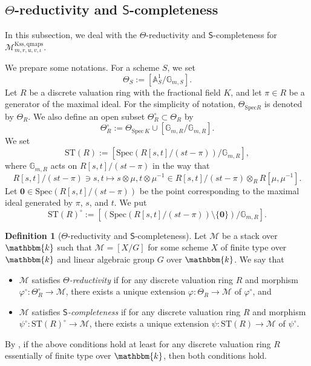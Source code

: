 \documentclass[12pt,twoside]{amsart}
\theoremstyle{definition}
\newtheorem{defn}[thm]{Definition}
\begin{document}
\subsection{$\Theta$-reductivity and $\mathsf{S}$-completeness}

In this subsection, we deal with the $\Theta$-reductivity and $\mathsf{S}$-completeness for $\mathcal{M}^{\mathrm{Kss,qmaps}}_{m,r,u,v,\iota}$. 

We prepare some notations. 
For a scheme $S$, we set 
$$\Theta_S:=[\mathbb{A}^1_{S}/\mathbb{G}_{m,S}].$$
    Let $R$ be a discrete valuation ring with the fractional field $K$, and let $\pi\in R$ be a generator of the maximal ideal.
    For the simplicity of notation, $\Theta_{\mathrm{Spec}R}$ is denoted by $\Theta_R$.
 We also define an open subset $\Theta_R^\circ \subset \Theta_R$ by
$$\Theta_R^\circ:=\Theta_{\mathrm{Spec}\,K}\cup [\mathbb{G}_{m,R}/\mathbb{G}_{m,R}].$$
    We set 
    $$\mathrm{ST}(R):=[\mathrm{Spec}(R[s,t]/(st-\pi))/\mathbb{G}_{m,R}],$$
     where $\mathbb{G}_{m,R}$ acts on $R[s,t]/(st-\pi)$ in the way that 
    \[
    R[s,t]/(st-\pi)\ni s,t\mapsto s\otimes\mu,t\otimes\mu^{-1}\in  R[s,t]/(st-\pi)\otimes_RR[\mu,\mu^{-1}].
    \]
    Let $\mathbf{0}\in\mathrm{Spec}(R[s,t]/(st-\pi))$ be the point corresponding to the maximal ideal generated by $\pi$, $s$, and $t$. 
    We put $$\mathrm{ST}(R)^\circ:=[(\mathrm{Spec}(R[s,t]/(st-\pi))\setminus\{\mathbf{0}\})/\mathbb{G}_{m,R}].$$

\begin{defn}[$\Theta$-reductivity and $\mathsf{S}$-completeness]
   Let $\mathcal{M}$ be a stack over $\mathbbm{k}$ such that $\mathcal{M}=[X/G]$ for some scheme $X$ of finite type over $\mathbbm{k}$ and linear algebraic group $G$ over $\mathbbm{k}$.
    We say that 
    \begin{itemize}
        \item $\mathcal{M}$ satisfies {\it $\Theta$-reductivity} if for any discrete valuation ring $R$ and morphism $\varphi^\circ\colon\Theta_R^\circ\to \mathcal{M}$, there exists a unique extension $\varphi\colon \Theta_R\to \mathcal{M}$ of $\varphi^\circ$, and
        \item $\mathcal{M}$ satisfies {\it $\mathsf{S}$-completeness} if for any discrete valuation ring $R$ and morphism $\psi^\circ\colon\mathrm{ST}(R)^\circ\to \mathcal{M}$, there exists a unique extension $\psi\colon \mathrm{ST}(R)\to \mathcal{M}$ of $\psi^\circ$.
    \end{itemize}
    By \cite[Propositions 3.18 and 3.42]{AHLH}, if the above conditions hold at least for any discrete valuation ring $R$ essentially of finite type over $\mathbbm{k}$, then both conditions hold.
\end{defn}
\end{document}

